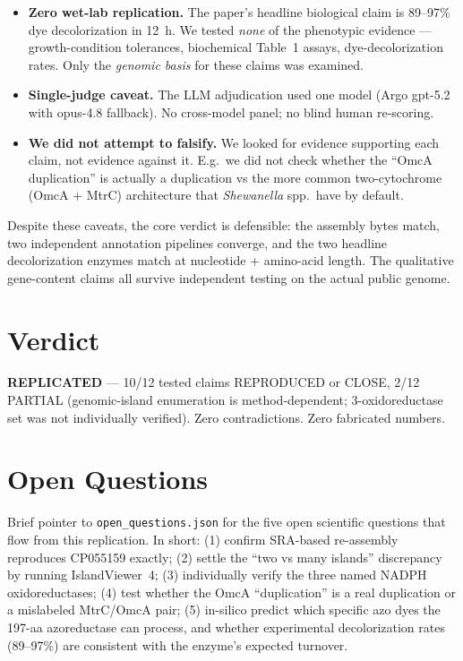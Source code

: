\documentclass[11pt]{article}
\begin{document}
\begin{itemize}
        DIMOB-only, single-method predictor found 7 islands vs the paper's 2.
        This is a real discrepancy and we tolerate it as ``method-dependent''
        rather than pushing to run IslandViewer~4 ourselves.
  \item \textbf{Zero wet-lab replication.} The paper's headline biological
        claim is 89--97\% dye decolorization in 12~h. We tested \emph{none} of
        the phenotypic evidence --- growth-condition tolerances, biochemical
        Table~1 assays, dye-decolorization rates. Only the \emph{genomic basis}
        for these claims was examined.
  \item \textbf{Single-judge caveat.} The LLM adjudication used one model
        (Argo gpt-5.2 with opus-4.8 fallback). No cross-model panel; no
        blind human re-scoring.
  \item \textbf{We did not attempt to falsify.} We looked for evidence
        supporting each claim, not evidence against it. E.g.\ we did not
        check whether the ``OmcA duplication'' is actually a duplication vs
        the more common two-cytochrome (OmcA + MtrC) architecture that
        \emph{Shewanella} spp.\ have by default.
\end{itemize}

Despite these caveats, the core verdict is defensible: the assembly bytes
match, two independent annotation pipelines converge, and the two headline
decolorization enzymes match at nucleotide + amino-acid length. The
qualitative gene-content claims all survive independent testing on the
actual public genome.

\section{Verdict}
\textbf{REPLICATED} --- 10/12 tested claims REPRODUCED or CLOSE, 2/12 PARTIAL
(genomic-island enumeration is method-dependent; 3-oxidoreductase set was
not individually verified). Zero contradictions. Zero fabricated numbers.

\section{Open Questions}
Brief pointer to \texttt{open\_questions.json} for the five open scientific
questions that flow from this replication. In short: (1) confirm SRA-based
re-assembly reproduces CP055159 exactly; (2) settle the ``two vs many
islands'' discrepancy by running IslandViewer~4; (3) individually verify the
three named NADPH oxidoreductases; (4) test whether the OmcA
``duplication'' is a real duplication or a mislabeled MtrC/OmcA pair; (5)
in-silico predict which specific azo dyes the 197-aa azoreductase can
process, and whether experimental decolorization rates (89--97\%) are
consistent with the enzyme's expected turnover.
\end{document}
